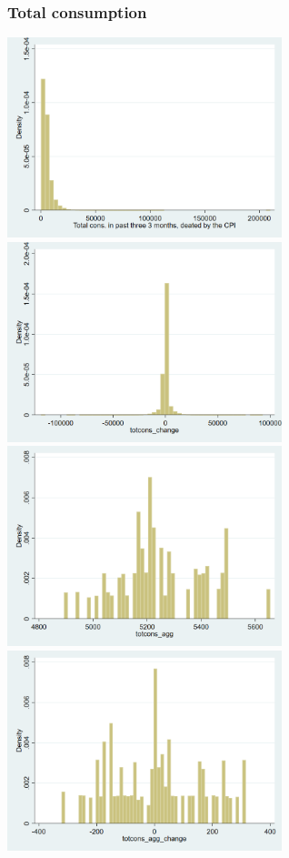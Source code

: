 \documentclass[12pt,a4paper]{article}
\begin{document}
\subsubsection*{Total consumption}
\begin{center}
\includegraphics[width=8cm]{totcons.png}
\includegraphics[width=8cm]{totcons_change.png}\\
\includegraphics[width=8cm]{totcons_agg.png}
\includegraphics[width=8cm]{totcons_agg_change.png}\\

\end{center}
\end{document}
